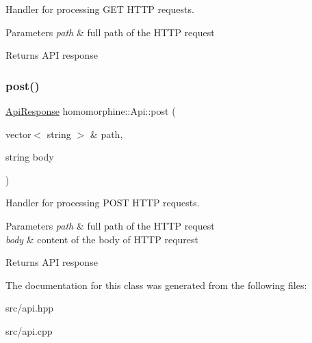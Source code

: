 Handler for processing G\+ET H\+T\+TP requests.


\begin{DoxyParams}{Parameters}
{\em path} & full path of the H\+T\+TP request \\
\hline
\end{DoxyParams}
\begin{DoxyReturn}{Returns}
A\+PI response 
\end{DoxyReturn}
\mbox{\label{classhomomorphine_1_1_api_ab538a352f9ef7e92885bdd25a2f3dedd}} 
\subsubsection{\texorpdfstring{post()}{post()}}
{\footnotesize\ttfamily \mbox{\hyperlink{classhomomorphine_1_1_api_response}{Api\+Response}} homomorphine\+::\+Api\+::post (\begin{DoxyParamCaption}\item[{vector$<$ string $>$ \&}]{path,  }\item[{string}]{body }\end{DoxyParamCaption})}

Handler for processing P\+O\+ST H\+T\+TP requests.


\begin{DoxyParams}{Parameters}
{\em path} & full path of the H\+T\+TP request \\
\hline
{\em body} & content of the body of H\+T\+TP requrest \\
\hline
\end{DoxyParams}
\begin{DoxyReturn}{Returns}
A\+PI response 
\end{DoxyReturn}


The documentation for this class was generated from the following files\+:\begin{DoxyCompactItemize}
\item 
src/api.\+hpp\item 
src/api.\+cpp\end{DoxyCompactItemize}

